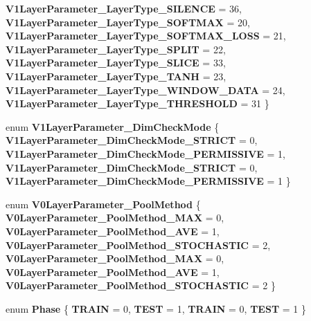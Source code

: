 \begin{DoxyCompactItemize}
\newline
{\bfseries V1\+Layer\+Parameter\+\_\+\+Layer\+Type\+\_\+\+S\+I\+L\+E\+N\+CE} = 36, 
{\bfseries V1\+Layer\+Parameter\+\_\+\+Layer\+Type\+\_\+\+S\+O\+F\+T\+M\+AX} = 20, 
{\bfseries V1\+Layer\+Parameter\+\_\+\+Layer\+Type\+\_\+\+S\+O\+F\+T\+M\+A\+X\+\_\+\+L\+O\+SS} = 21, 
{\bfseries V1\+Layer\+Parameter\+\_\+\+Layer\+Type\+\_\+\+S\+P\+L\+IT} = 22, 
\newline
{\bfseries V1\+Layer\+Parameter\+\_\+\+Layer\+Type\+\_\+\+S\+L\+I\+CE} = 33, 
{\bfseries V1\+Layer\+Parameter\+\_\+\+Layer\+Type\+\_\+\+T\+A\+NH} = 23, 
{\bfseries V1\+Layer\+Parameter\+\_\+\+Layer\+Type\+\_\+\+W\+I\+N\+D\+O\+W\+\_\+\+D\+A\+TA} = 24, 
{\bfseries V1\+Layer\+Parameter\+\_\+\+Layer\+Type\+\_\+\+T\+H\+R\+E\+S\+H\+O\+LD} = 31
 \}
\item 
\mbox{\label{namespacecaffe_adf727d7f79f08a7f1419e0605175bc85}} 
enum {\bfseries V1\+Layer\+Parameter\+\_\+\+Dim\+Check\+Mode} \{ {\bfseries V1\+Layer\+Parameter\+\_\+\+Dim\+Check\+Mode\+\_\+\+S\+T\+R\+I\+CT} = 0, 
{\bfseries V1\+Layer\+Parameter\+\_\+\+Dim\+Check\+Mode\+\_\+\+P\+E\+R\+M\+I\+S\+S\+I\+VE} = 1, 
{\bfseries V1\+Layer\+Parameter\+\_\+\+Dim\+Check\+Mode\+\_\+\+S\+T\+R\+I\+CT} = 0, 
{\bfseries V1\+Layer\+Parameter\+\_\+\+Dim\+Check\+Mode\+\_\+\+P\+E\+R\+M\+I\+S\+S\+I\+VE} = 1
 \}
\item 
\mbox{\label{namespacecaffe_ab08663996d43522220c91bc42fbce27a}} 
enum {\bfseries V0\+Layer\+Parameter\+\_\+\+Pool\+Method} \{ \newline
{\bfseries V0\+Layer\+Parameter\+\_\+\+Pool\+Method\+\_\+\+M\+AX} = 0, 
{\bfseries V0\+Layer\+Parameter\+\_\+\+Pool\+Method\+\_\+\+A\+VE} = 1, 
{\bfseries V0\+Layer\+Parameter\+\_\+\+Pool\+Method\+\_\+\+S\+T\+O\+C\+H\+A\+S\+T\+IC} = 2, 
{\bfseries V0\+Layer\+Parameter\+\_\+\+Pool\+Method\+\_\+\+M\+AX} = 0, 
\newline
{\bfseries V0\+Layer\+Parameter\+\_\+\+Pool\+Method\+\_\+\+A\+VE} = 1, 
{\bfseries V0\+Layer\+Parameter\+\_\+\+Pool\+Method\+\_\+\+S\+T\+O\+C\+H\+A\+S\+T\+IC} = 2
 \}
\item 
\mbox{\label{namespacecaffe_ae5c0b3a0799bdeaa06cc4dcbe95f0425}} 
enum {\bfseries Phase} \{ {\bfseries T\+R\+A\+IN} = 0, 
{\bfseries T\+E\+ST} = 1, 
{\bfseries T\+R\+A\+IN} = 0, 
{\bfseries T\+E\+ST} = 1
 \}
\item 
\mbox{\label{namespacecaffe_aebff8dd5e6547e6164a9f9e8a2fc36ff}} 

\end{DoxyCompactItemize}
